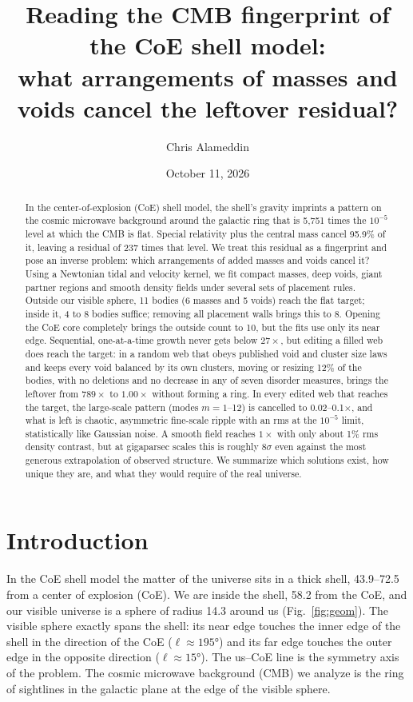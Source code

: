 \documentclass[aps,prd,twocolumn,nofootinbib,superscriptaddress,floatfix]{revtex4-2}
\begin{document}
\title{Reading the CMB fingerprint of the CoE shell model:\\ what arrangements of masses and voids cancel the leftover residual?}
\author{Chris Alameddin}
\date{October 11, 2026}
\begin{abstract}
In the center-of-explosion (CoE) shell model, the shell's gravity imprints a pattern on the cosmic microwave background around the galactic ring that is 5,751 times the $10^{-5}$ level at which the CMB is flat. Special relativity plus the central mass cancel 95.9\% of it, leaving a residual of 237 times that level. We treat this residual as a fingerprint and pose an inverse problem: which arrangements of added masses and voids cancel it? Using a Newtonian tidal and velocity kernel, we fit compact masses, deep voids, giant partner regions and smooth density fields under several sets of placement rules. Outside our visible sphere, 11 bodies (6 masses and 5 voids) reach the flat target; inside it, 4 to 8 bodies suffice; removing all placement walls brings this to 8. Opening the CoE core completely brings the outside count to 10, but the fits use only its near edge. Sequential, one-at-a-time growth never gets below $27\times$, but editing a filled web does reach the target: in a random web that obeys published void and cluster size laws and keeps every void balanced by its own clusters, moving or resizing 12\% of the bodies, with no deletions and no decrease in any of seven disorder measures, brings the leftover from $789\times$ to $1.00\times$ without forming a ring. In every edited web that reaches the target, the large-scale pattern (modes $m=1$--12) is cancelled to 0.02--0.1$\times$, and what is left is chaotic, asymmetric fine-scale ripple with an rms at the $10^{-5}$ limit, statistically like Gaussian noise. A smooth field reaches $1\times$ with only about 1\% rms density contrast, but at gigaparsec scales this is roughly $8\sigma$ even against the most generous extrapolation of observed structure. We summarize which solutions exist, how unique they are, and what they would require of the real universe.
\end{abstract}
\maketitle

\section{Introduction}
In the CoE shell model the matter of the universe sits in a thick shell, \SIrange{43.9}{72.5}{\Gpc} from a center of explosion (CoE). We are inside the shell, \SI{58.2}{\Gpc} from the CoE, and our visible universe is a sphere of radius \SI{14.3}{\Gpc} around us (Fig.~\ref{fig:geom}). The visible sphere exactly spans the shell: its near edge touches the inner edge of the shell in the direction of the CoE ($\ell\approx\ang{195}$) and its far edge touches the outer edge in the opposite direction ($\ell\approx\ang{15}$). The us--CoE line is the symmetry axis of the problem. The cosmic microwave background (CMB) we analyze is the ring of sightlines in the galactic plane at the edge of the visible sphere.
\end{document}
